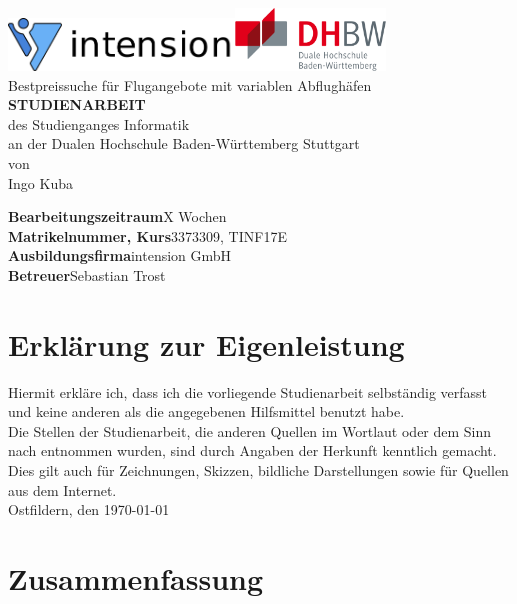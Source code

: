 \documentclass[12pt,twoside,a4paper]{article}
\begin{document}
\begin{center}
\href{https://www.intension.de/}{\includegraphics[width=6cm]{images/intension}}\hfill\href{https://www.dhbw-stuttgart.de}{\includegraphics[width=4cm]{images/dhbw}}\\
\large
\vspace{3cm}Bestpreissuche für Flugangebote mit variablen Abflughäfen\\
\vfill
\textbf{\Large STUDIENARBEIT}
\vspace{1cm}\\des Studienganges Informatik
\\an der Dualen Hochschule Baden-Württemberg Stuttgart
\vspace{1cm}
\\von
\\Ingo Kuba
\end{center}
\vspace{2cm}
\textbf{Bearbeitungszeitraum}\hfill X Wochen\\
\textbf{Matrikelnummer, Kurs}\hfill 3373309, TINF17E\\
\textbf{Ausbildungsfirma}\hfill intension GmbH\\
\textbf{Betreuer}\hfill Sebastian Trost
\newpage
\section*{Erklärung zur Eigenleistung}
Hiermit erkläre ich, dass ich die vorliegende Studienarbeit selbständig verfasst und keine anderen als die angegebenen Hilfsmittel benutzt habe.\\
Die Stellen der Studienarbeit, die anderen Quellen im Wortlaut oder dem Sinn nach entnommen wurden, sind durch Angaben der Herkunft kenntlich gemacht. Dies gilt auch für Zeichnungen, Skizzen, bildliche Darstellungen sowie für Quellen aus dem Internet.
\vspace{1cm}\\Ostfildern, den \today \hspace{1cm} \hrulefill
\newpage
\section*{Zusammenfassung}
\newpage
\tableofcontents
\newpage
\listoffigures
\newpage
\printglossary[type=\acronymtype]
\printglossary
\newpage
{}
\setcounter{page}{1}
\end{document}
